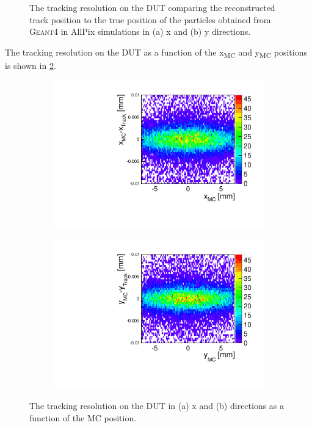 \begin{figure}[htbp]
\begin{subfigure}[b]{0.45\textwidth}
    \caption{}
  \end{subfigure}
  \caption{The tracking resolution on the DUT comparing the
    reconstructed track position to the true position of the particles
    obtained from \textsc{Geant4} in AllPix simulations in (a) x and
    (b) y directions.}
  \label{fig:DUT_MC_track}
\end{figure}


The tracking resolution on the DUT as a function of the
x\textsubscript{MC} and y\textsubscript{MC} positions is shown in
\cref{fig:DUT_MC_track_2D}.

\begin{figure}[htbp] \centering
  \begin{subfigure}[b]{0.45\textwidth}
    \includegraphics[width=\textwidth]{figures/Telescope/Unbiased_trackRes_DUT_x_2D.pdf}
    \caption{}
  \end{subfigure}\hfill
  \begin{subfigure}[b]{0.45\textwidth}
    \includegraphics[width=\textwidth]{figures/Telescope/Unbiased_trackRes_DUT_y_2D.pdf}
    \caption{}
  \end{subfigure}
  \caption{The tracking resolution on the DUT in (a) x and (b)
    directions as a function of the MC position.}
  \label{fig:DUT_MC_track_2D}
\end{figure}

